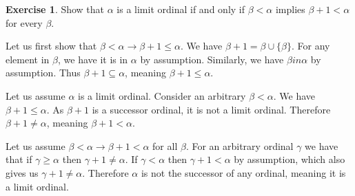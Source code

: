 \documentclass{article}
\theoremstyle{definition}
\newtheorem{exer}{Exercise}[section]
\DeclareMathOperator{\ran}{ran}
\newlength{\defparindent}
\newenvironment{answer}
    {\begin{mdframed}[backgroundcolor=gray!15, linewidth=0pt] \setlength{\parindent}{\defparindent}}
    {\end{mdframed}}
\begin{document}


\begin{exer}
    Show that $\alpha$ is a limit ordinal if and only if $\beta < \alpha$ implies $\beta + 1 < \alpha$ for every $\beta$. 

    \begin{answer}
        Let us first show that $\beta < \alpha \to \beta + 1 \le \alpha$. We have $\beta + 1 = \beta \cup \{\beta\}$. For any element in $\beta$, we have it is in $\alpha$ by assumption. Similarly, we have $\beta in \alpha$ by assumption. Thus $\beta + 1 \subseteq \alpha$, meaning $\beta + 1 \le \alpha$.

        Let us assume $\alpha$ is a limit ordinal. Consider an arbitrary $\beta < \alpha$. We have $\beta + 1 \le \alpha$. As $\beta + 1$ is a successor ordinal, it is not a limit ordinal. Therefore $\beta + 1 \ne \alpha$, meaning $\beta + 1 < \alpha$.

        Let us assume $\beta < \alpha \to \beta + 1 < \alpha$ for all $\beta$. For an arbitrary ordinal $\gamma$ we have that if $\gamma \ge \alpha$ then $\gamma + 1 \ne \alpha$. If $\gamma < \alpha$ then $\gamma + 1 < \alpha$ by assumption, which also gives us $\gamma + 1 \ne \alpha$. Therefore $\alpha$ is not the successor of any ordinal, meaning it is a limit ordinal.
    \end{answer}
\end{exer}
\end{document}
